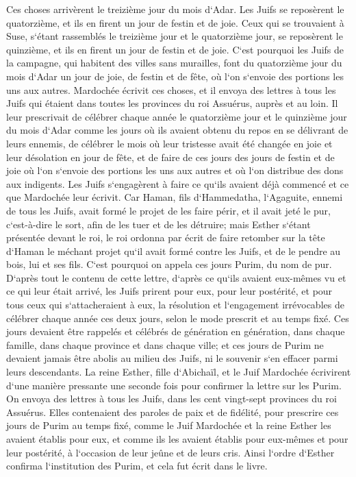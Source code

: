\verse Ces choses arrivèrent le treizième jour du mois d`Adar. Les Juifs se reposèrent le quatorzième, et ils en firent un jour de festin et de joie. 
\verse Ceux qui se trouvaient à Suse, s`étant rassemblés le treizième jour et le quatorzième jour, se reposèrent le quinzième, et ils en firent un jour de festin et de joie. 
\verse C`est pourquoi les Juifs de la campagne, qui habitent des villes sans murailles, font du quatorzième jour du mois d`Adar un jour de joie, de festin et de fête, où l`on s`envoie des portions les uns aux autres. 
\verse Mardochée écrivit ces choses, et il envoya des lettres à tous les Juifs qui étaient dans toutes les provinces du roi Assuérus, auprès et au loin. 
\verse Il leur prescrivait de célébrer chaque année le quatorzième jour et le quinzième jour du mois d`Adar 
\verse comme les jours où ils avaient obtenu du repos en se délivrant de leurs ennemis, de célébrer le mois où leur tristesse avait été changée en joie et leur désolation en jour de fête, et de faire de ces jours des jours de festin et de joie où l`on s`envoie des portions les uns aux autres et où l`on distribue des dons aux indigents. 
\verse Les Juifs s`engagèrent à faire ce qu`ils avaient déjà commencé et ce que Mardochée leur écrivit. 
\verse Car Haman, fils d`Hammedatha, l`Agaguite, ennemi de tous les Juifs, avait formé le projet de les faire périr, et il avait jeté le pur, c`est-à-dire le sort, afin de les tuer et de les détruire; 
\verse mais Esther s`étant présentée devant le roi, le roi ordonna par écrit de faire retomber sur la tête d`Haman le méchant projet qu`il avait formé contre les Juifs, et de le pendre au bois, lui et ses fils. 
\verse C`est pourquoi on appela ces jours Purim, du nom de pur. D`après tout le contenu de cette lettre, d`après ce qu`ils avaient eux-mêmes vu et ce qui leur était arrivé, 
\verse les Juifs prirent pour eux, pour leur postérité, et pour tous ceux qui s`attacheraient à eux, la résolution et l`engagement irrévocables de célébrer chaque année ces deux jours, selon le mode prescrit et au temps fixé. 
\verse Ces jours devaient être rappelés et célébrés de génération en génération, dans chaque famille, dans chaque province et dans chaque ville; et ces jours de Purim ne devaient jamais être abolis au milieu des Juifs, ni le souvenir s`en effacer parmi leurs descendants. 
\verse La reine Esther, fille d`Abichaïl, et le Juif Mardochée écrivirent d`une manière pressante une seconde fois pour confirmer la lettre sur les Purim. 
\verse On envoya des lettres à tous les Juifs, dans les cent vingt-sept provinces du roi Assuérus. Elles contenaient des paroles de paix et de fidélité, 
\verse pour prescrire ces jours de Purim au temps fixé, comme le Juif Mardochée et la reine Esther les avaient établis pour eux, et comme ils les avaient établis pour eux-mêmes et pour leur postérité, à l`occasion de leur jeûne et de leurs cris. 
\verse Ainsi l`ordre d`Esther confirma l`institution des Purim, et cela fut écrit dans le livre. 

